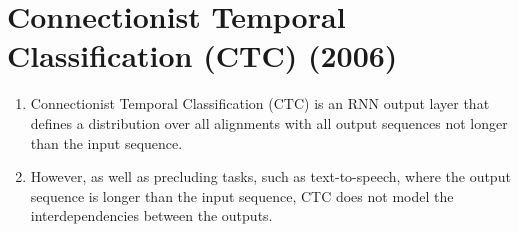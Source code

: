 \chapter{Connectionist Temporal Classification (CTC) (2006)}

\begin{tcolorbox}
\end{tcolorbox}



\begin{enumerate}
    \item Connectionist Temporal Classification (CTC) is an RNN output layer that defines a distribution over all alignments with all output sequences not longer than the input sequence.
    \hfill \cite{arxiv/1211.3711/Sequence-Transduction-RNN}

    \item  However, as well as precluding tasks, such as text-to-speech, where the output sequence is longer than the input sequence, CTC does not model the interdependencies between the outputs. 
    \hfill \cite{arxiv/1211.3711/Sequence-Transduction-RNN}
\end{enumerate}














